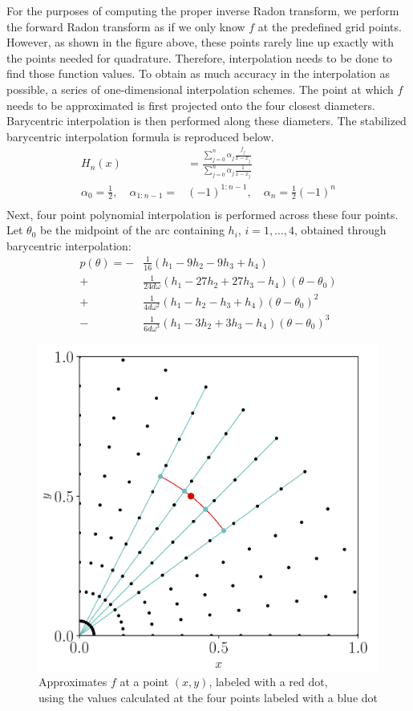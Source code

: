 For the purposes of computing the proper inverse Radon transform, we perform the forward Radon transform as if we only know $f$ at the predefined grid points.
However, as shown in the figure above, these points rarely line up exactly with the points needed for quadrature.
Therefore, interpolation needs to be done to find those function values.
To obtain as much accuracy in the interpolation as possible, a series of one-dimensional interpolation schemes.
The point at which $f$ needs to be approximated is first projected onto the four closest diameters.
Barycentric interpolation is then performed along these diameters.
The stabilized barycentric interpolation formula \cite{Trefethen:7} is reproduced below.
\begin{align*}
    H_n(x)&= \frac{\sum_{j = 0}^{n} \alpha_j \frac{f_j}{x-x_j}}{\sum_{j = 0}^{n} \alpha_j\frac{1}{x-x_j}} \\ 
    \alpha_0 = \frac{1}{2},\quad \alpha_{1:n-1} = &(-1)^{1:n-1},\quad \alpha_n = \frac{1}{2} (-1)^n \\
\end{align*} 
Next, four point polynomial interpolation is performed across these four points.
Let $\theta_0$ be the midpoint of the arc containing $h_i$, $i=1,\dots,4$, obtained through barycentric interpolation:
\begin{align*}
    p(\theta) = - &\frac{1}{16}(h_1 - 9h_2 - 9h_3 + h_4) \\
    + &\frac{1}{24d\omega}(h_1 - 27h_2 + 27h_3 - h_4)(\theta - \theta_0) \\
    + &\frac{1}{4d\omega^2}(h_1 - h_2 - h_3 + h_4)(\theta - \theta_0)^2 \\
    - &\frac{1}{6d\omega^3}(h_1 - 3h_2 + 3h_3 - h_4)(\theta - \theta_0)^3
\end{align*}
\begin{figure}[H]
	\centering
	\includegraphics[scale=0.5]{figures/Interp4.png}
	\caption{Approximates $f$ at a point $(x, y)$, labeled with a red dot, \\using the values calculated at the four points labeled with a blue dot}
\end{figure}

